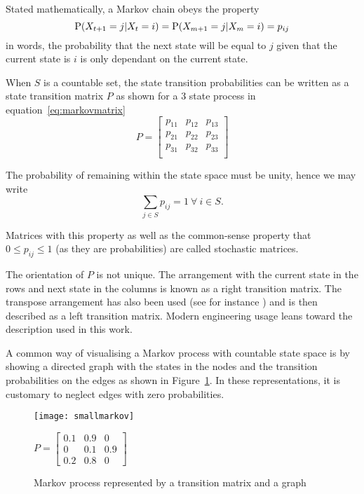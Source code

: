 Stated mathematically, a Markov chain obeys the property
\begin{equation}
  \label{eq:markovproperty}
  \mathrm{P}(X_{t+1} = j|X_{t}=i) = \mathrm{P}(X_{m+1}=j|X_{m}=i)=p_{ij}
\end{equation}
in words, the probability that the next state will be equal to $j$ given that the current state is $i$ is only dependant on the current state.

When $S$ is a countable set, the state transition probabilities can be written  as a state transition matrix $P$ as shown for a 3 state process in equation~\ref{eq:markovmatrix}
\begin{equation}
\label{eq:markovmatrix}
P = \left[ 
  \begin{array}{cccc}
    p_{11} & p_{12} & p_{13}\\
    p_{21} & p_{22} & p_{23}\\
    p_{31} & p_{32} & p_{33}\\
  \end{array} \right ]
\end{equation}

The probability of remaining within the state space must be unity, hence we may write 
\begin{equation}
  \label{eq:rowsumone}
  \sum_{j\in S} p_{ij}=1~\forall~i \in S.
\end{equation}

Matrices with this property as well as the common-sense property that $0 \leq p_{ij} \leq 1$ (as they are probabilities) are called stochastic matrices.

The orientation of $P$ is not unique. 
The arrangement with the current state in the rows and next state in the columns is known as a right transition matrix. 
The transpose arrangement has also been used (see for instance \citet{bhar.hamori2004hidden}) and is then described as a left transition matrix. 
Modern engineering usage leans toward the description used in this work.

A common way of visualising a Markov process with countable state space is by showing a directed graph with the states in the nodes and the transition probabilities on the edges as shown in Figure~\ref{fig:markovgraph}.
In these representations, it is customary to neglect edges with zero probabilities.

\begin{figure}[htbp]
  \centering
  \begin{minipage}{0.4\textwidth}
    \texttt{[image: smallmarkov]}
  \end{minipage}
  \begin{minipage}{0.4\textwidth}
   $\displaystyle P = \left [ 
      \begin{array}{ccc} 
        0.1 & 0.9 & 0 \\ 
        0 & 0.1 & 0.9 \\ 
        0.2 & 0.8 & 0 
      \end{array} \right ]$
  \end{minipage}
  \caption{Markov process represented by a transition matrix and a graph}
  \label{fig:markovgraph}
\end{figure}

